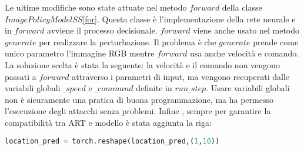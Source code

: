 Le ultime modifiche sono state attuate nel metodo $forward$ della classe $ImagePolicyModelSS$\ref{for}. Questa classe è l'implementazione della rete neurale e in $forward$ avviene il processo decisionale.
$forward$ viene anche usato nel metodo $generate$ per realizzare la perturbazione. Il problema è che $generate$ prende come unico parametro l'immagine RGB mentre $forward$ usa anche velocità e comando.
La soluzione scelta è stata la seguente: la velocità e il comando non vengono passati a $forward$ attraverso i  parametri di input, ma vengono recuperati  dalle variabili globali $\_speed$ e $\_command$ definite in $run\_step$. Usare variabili globali
non è sicuramente una pratica di buona programmazione, ma ha permesso l'esecuzione degli attacchi senza problemi. Infine , sempre per garantire la compatibilità tra ART  e modello è stata aggiunta la riga:
\begin{lstlisting}[language=Python]
    location_pred = torch.reshape(location_pred,(1,10))
\end{lstlisting}




